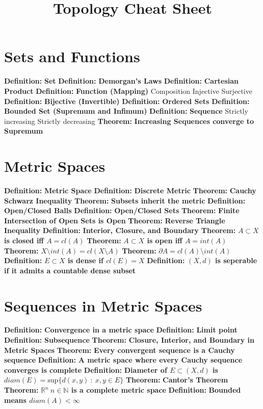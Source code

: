 \documentclass[14pt]{extarticle}
\title{Topology Cheat Sheet}
\def\Definition{{\color{Blue} \textbf{Definition:} }}
\def\Theorem{{\color{Red} \textbf{Theorem:} }}
\begin{document}
	\maketitle


	\begin{outline}	
		\section{Sets and Functions}
		\1	\Definition \textbf{Set}
		\1	\Definition \textbf{Demorgan's Laws}
		\1	\Definition \textbf{Cartesian Product}
		\1	\Definition \textbf{Function (Mapping)}
			\2	Composition
			\2	Injective
			\2	Surjective
		\1	\Definition \textbf{Bijective (Invertible)}
		\1	\Definition \textbf{Ordered Sets}
		\1	\Definition \textbf{Bounded Set (Supremum and Infimum)}
		\1	\Definition \textbf{Sequence}
			\2	Strictly increasing
			\2	Strictly decreasing
		\1	\Theorem \textbf{Increasing Sequences converge to Supremum}
		\section{Metric Spaces}
		\1	\Definition \textbf{Metric Space}
		\1	\Definition \textbf{Discrete Metric}
		\1	\Theorem \textbf{Cauchy Schwarz Inequality}
		\1	\Theorem \textbf{Subsets inherit the metric}
		\1	\Definition \textbf{Open/Closed Balls}
		\1	\Definition \textbf{Open/Closed Sets}
			\2	\Theorem \textbf{Finite Intersection of Open Sets is Open}
		\1	\Theorem \textbf{Reverse Triangle Inequality}
		\1	\Definition \textbf{Interior, Closure, and Boundary}
		\1	\Theorem \textbf{$A \subset X$ is closed iff $A = cl(A)$}
		\1	\Theorem \textbf{$A \subset X$ is open iff $A = int(A)$}
		\1	\Theorem \textbf{$X \setminus int(A) = cl(X \setminus A)$}
		\1	\Theorem \textbf{$\partial A = cl(A) \setminus int(A)$}
		\1	\Definition \textbf{$E \subset X$ is dense if $cl(E) = X$} 
		\1	\Definition \textbf{$(X,d)$ is seperable if it admits a countable dense subset}
		\section{Sequences in Metric Spaces}
		\1	\Definition \textbf{Convergence in a metric space}
		\1	\Definition \textbf{Limit point}
		\1	\Definition \textbf{Subsequence}
		\1	\Theorem \textbf{Closure, Interior, and Boundary in Metric Spaces}
		\1	\Theorem	\textbf{Every convergent sequence is a Cauchy sequence}
		\1	\Definition \textbf{A metric space where every Cauchy sequence converges is complete}
		\1	\Definition \textbf{Diameter of $E \subset (X,d)$ is $diam(E) = \text{sup}\{d(x,y) ~:~x,y \in E\}$}
		\1	\Theorem	\textbf{Cantor's Theorem}
		\1	\Theorem	\textbf{$\mathbb{R}^n~n \in \mathbb{N}$ is a complete metric space}
		\1	\Definition \textbf{Bounded means $diam(A) < \infty$}

\end{outline}
\end{document}
